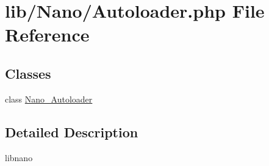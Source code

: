 \hypertarget{Autoloader_8php}{
\section{lib/Nano/Autoloader.php File Reference}
\label{Autoloader_8php}
}
\subsection*{Classes}
\begin{CompactItemize}
\item 
class \hyperlink{classNano__Autoloader}{Nano\_\-Autoloader}
\end{CompactItemize}


\subsection{Detailed Description}
libnano 